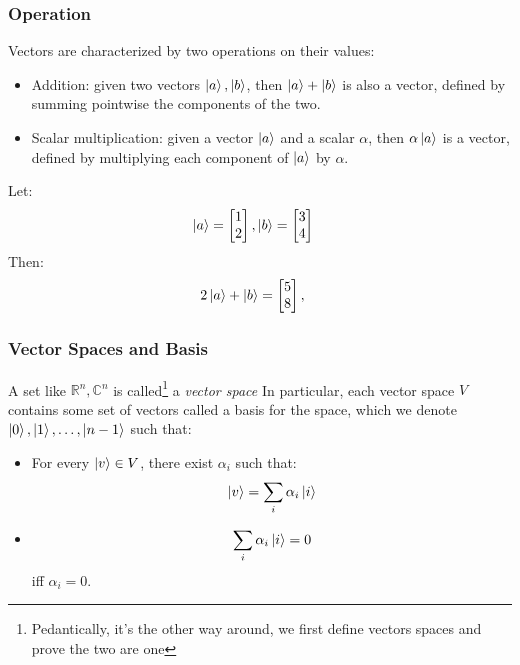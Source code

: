 \documentclass{beamer}
\begin{document}
    \begin{frame}
        \frametitle{Operation}
        Vectors are characterized by two operations on their values:
        \begin{itemize}
            \item Addition: given two vectors $\ket{a}, \ket{b}$, then $\ket{a} + \ket{b}$ is also a vector, defined by summing pointwise the components of the two.
            \item Scalar multiplication: given a vector $\ket{a}$ and a scalar $\alpha$, then $\alpha \ket{a}$ is a vector, defined by multiplying each component of $\ket{a}$ by $\alpha$. 
        \end{itemize}
        \begin{example}
            Let: 
            \begin{align}
                \ket{a} &= \begin{bmatrix}
                       1 \\
                       2
                \end{bmatrix}, 
                \ket{b} = \begin{bmatrix}
                    3 \\
                    4 
             \end{bmatrix} 
              \end{align}
              Then:
              \begin{align}
                2\ket{a} + \ket{b} &= \begin{bmatrix}
                       5 \\
                       8
                \end{bmatrix}, 
              \end{align}
        \end{example}
    \end{frame}
    \begin{frame}
        \frametitle{Vector Spaces and Basis}
        A set like $\mathbb{R}^n, \mathbb{C}^n$ is called\footnote{Pedantically, it's the other way around, we first define vectors spaces and prove the two are one} a \textit{vector space}
        In particular, each vector space $V$ contains some set of vectors called a basis for the space, which we denote $\ket{0}, \ket{1}, \dots, \ket{n - 1}$ such that:
        \begin{itemize}
            \item For every $\ket{v} \in V$, there exist $\alpha_i$ such that: \[ \ket{v} = \sum_i \alpha_i \ket{i}  \]
            \item \[ \sum_i \alpha_i \ket{i} = 0 \] iff $\alpha_i = 0$.
        \end{itemize}
    \end{frame}
\end{document}

